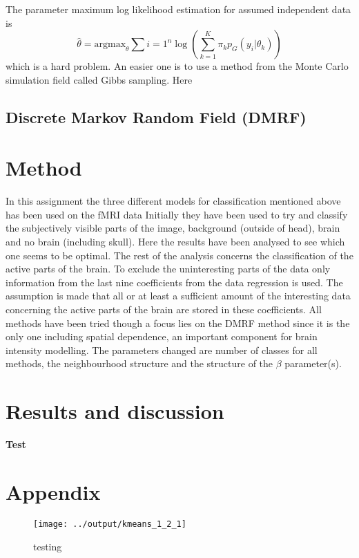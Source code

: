 \documentclass[a4paper,english]{article}
\newcommand{\sexion}[1]{\section{#1}}
\begin{document}
The parameter maximum log likelihood estimation for assumed independent data is
\begin{equation}
  \hat{\theta} = \text{argmax}_{\theta} \sum{i = 1}^n \log \left(  \sum_{k=1}^K \pi_k p_G(y_i | \theta_k) \right)
\end{equation}
which is a hard problem.
An easier one is to use a method from the Monte Carlo simulation field called Gibbs sampling.
Here

\subsection{Discrete Markov Random Field (DMRF)}


\section{Method}
In this assignment the three different models for classification mentioned above has been used on the fMRI data
Initially they have been used to try and classify the subjectively visible parts of the image, background (outside of head), brain and no brain (including skull).
Here the results have been analysed to see which one seems to be optimal.
The rest of the analysis concerns the classification of the active parts of the brain.
To exclude the uninteresting parts of the data only information from the last nine coefficients from the data regression is used.
The assumption is made that all or at least a sufficient amount of the interesting data concerning the active parts of the brain are stored in these coefficients.
All methods have been tried though a focus lies on the DMRF method since it is the only one including spatial dependence, an important component for brain intensity modelling.
The parameters changed are number of classes for all methods, the neighbourhood structure and the structure of the $\beta$ parameter(s).

\section{Results and discussion}


\newpage

\begin{thebibliography}{37}
   {\textbf{Test}}
\end{thebibliography}
\pagebreak{}

\sexion{Appendix}
\begin{figure}[H]
  \centering
  \texttt{[image: ../output/kmeans\_1\_2\_1]}
  \caption{testing}
  \label{fig:kmeans:1:2:1}
\end{figure}


% 


\pagebreak{}
\thispagestyle{empty}
\end{document}
